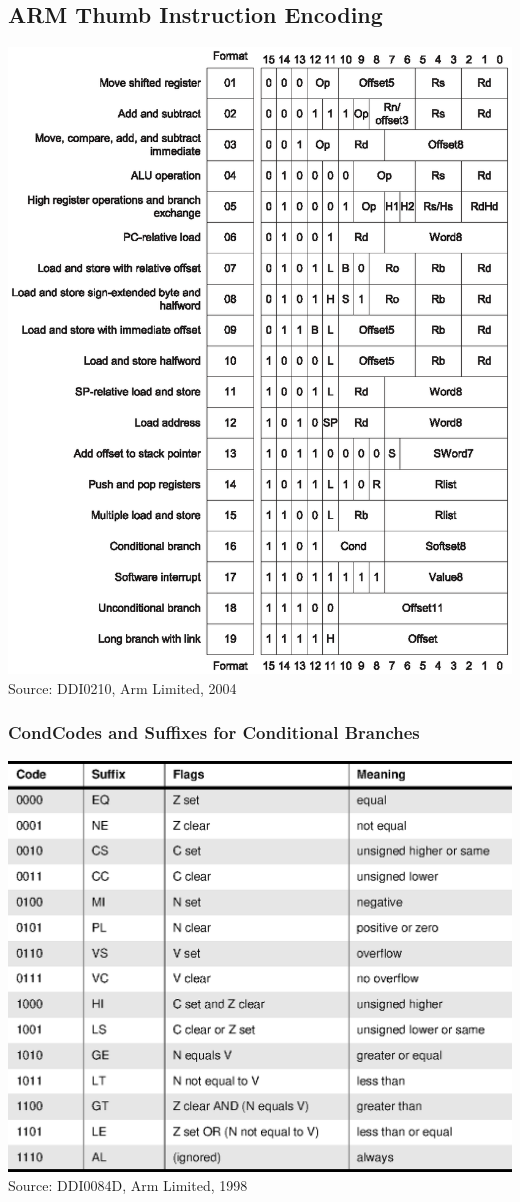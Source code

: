 \documentclass[12pt]{article}
\begin{document}
\subsection{ARM Thumb Instruction Encoding}
\label{encodings}
\vspace{0.5cm}
\includegraphics[width=\textwidth]{insencoding.eps}
Source: DDI0210, Arm Limited, 2004

\newpage
\subsubsection{CondCodes and Suffixes for Conditional Branches}
\label{condcodes}
\includegraphics[width=\textwidth]{condcodesummary.eps}
Source: DDI0084D, Arm Limited, 1998
\end{document}
